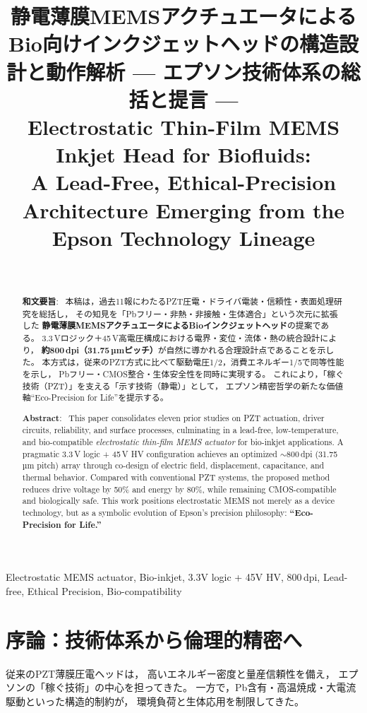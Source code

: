 \documentclass[conference]{IEEEtran}
\title{静電薄膜MEMSアクチュエータによるBio向けインクジェットヘッドの構造設計と動作解析 — エプソン技術体系の総括と提言 —\\
\large Electrostatic Thin-Film MEMS Inkjet Head for Biofluids:\\ A Lead-Free, Ethical-Precision Architecture Emerging from the Epson Technology Lineage}
\author{\IEEEauthorblockN{三溝 真一（Shinichi Samizo)}\\
\IEEEauthorblockA{独立系半導体研究者（元セイコーエプソン）\\
Email: \href{mailto:shin3t72@gmail.com}{shin3t72@gmail.com}\quad
GitHub: \url{https://github.com/Samizo-AITL}}}
\begin{document}
\maketitle

\begin{abstract}
\textbf{和文要旨}:~
本稿は，過去11報にわたるPZT圧電・ドライバ電装・信頼性・表面処理研究を総括し，
その知見を「Pbフリー・非熱・非接触・生体適合」という次元に拡張した
\textbf{静電薄膜MEMSアクチュエータによるBioインクジェットヘッド}の提案である。
3.3\,Vロジック＋45\,V高電圧構成における電界・変位・流体・熱の統合設計により，
\textbf{約800\,dpi（31.75\,µmピッチ）}が自然に導かれる合理設計点であることを示した。
本方式は，従来のPZT方式に比べて駆動電圧1/2，消費エネルギー1/5で同等性能を示し，
Pbフリー・CMOS整合・生体安全性を同時に実現する。
これにより，「稼ぐ技術（PZT）」を支える「示す技術（静電）」として，
エプソン精密哲学の新たな価値軸“Eco-Precision for Life”を提示する。

\noindent\textbf{Abstract}:~
This paper consolidates eleven prior studies on PZT actuation, driver circuits, reliability, and surface processes,
culminating in a lead-free, low-temperature, and bio-compatible
\emph{electrostatic thin-film MEMS actuator} for bio-inkjet applications.
A pragmatic 3.3\,V logic + 45\,V HV configuration achieves an optimized
$\sim$800\,dpi (31.75\,µm pitch) array through co-design of electric field, displacement, capacitance, and thermal behavior.
Compared with conventional PZT systems, the proposed method reduces drive voltage by 50\% and energy by 80\%, while remaining CMOS-compatible and biologically safe.
This work positions electrostatic MEMS not merely as a device technology,
but as a symbolic evolution of Epson’s precision philosophy: \textbf{“Eco-Precision for Life.”}
\end{abstract}

\begin{IEEEkeywords}
Electrostatic MEMS actuator, Bio-inkjet, 3.3V logic + 45V HV, 800\,dpi, Lead-free, Ethical Precision, Bio-compatibility
\end{IEEEkeywords}

\section{序論：技術体系から倫理的精密へ}
従来のPZT薄膜圧電ヘッドは，
高いエネルギー密度と量産信頼性を備え，
エプソンの「稼ぐ技術」の中心を担ってきた。
一方で，Pb含有・高温焼成・大電流駆動といった構造的制約が，
環境負荷と生体応用を制限してきた。
\end{document}
